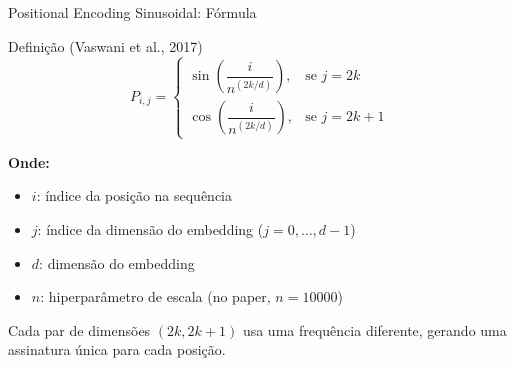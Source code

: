 \documentclass[aspectratio=169,xcolor=dvipsnames]{beamer}
\begin{document}
\begin{frame}{Positional Encoding Sinusoidal: Fórmula}

\begin{exampleblock}{Definição (Vaswani et al., 2017)}
\[
P_{i,j} =
\begin{cases}
\sin\!\left(\dfrac{i}{n^{(2k/d)}}\right), & \text{se } j = 2k \\[12pt]
\cos\!\left(\dfrac{i}{n^{(2k/d)}}\right), & \text{se } j = 2k + 1
\end{cases}
\]
\end{exampleblock}

\vspace{4pt}

\textbf{Onde:}
\begin{itemize}
    \item $i$: índice da posição na sequência
    \item $j$: índice da dimensão do embedding ($j = 0, \dots, d-1$)
    \item $d$: dimensão do embedding
    \item $n$: hiperparâmetro de escala (no paper, $n = 10000$)
\end{itemize}

\vspace{4pt}

Cada par de dimensões $(2k, 2k+1)$ usa uma frequência diferente, gerando uma assinatura única para cada posição.

\end{frame}

\end{document}
